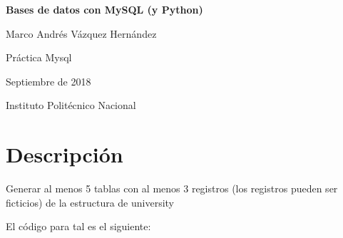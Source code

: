\documentclass[]{article}
\title{}
\author{}
\date{}
\begin{document}
\begin{centering}

\vspace*{5 cm}

\Huge

{\bf Bases de datos con MySQL (y Python)}

\vspace{3 cm}

\Large
Marco Andrés Vázquez Hernández

\vspace{1 cm}
\normalsize
Práctica Mysql

Septiembre de 2018

\normalsize
Instituto Politécnico Nacional


\end{centering}

\newpage

\section{Descripción}\label{descripcion}

Generar al menos 5 tablas con al menos 3 registros (los registros pueden
ser ficticios) de la estructura de university

El código para tal es el siguiente:
\end{document}
